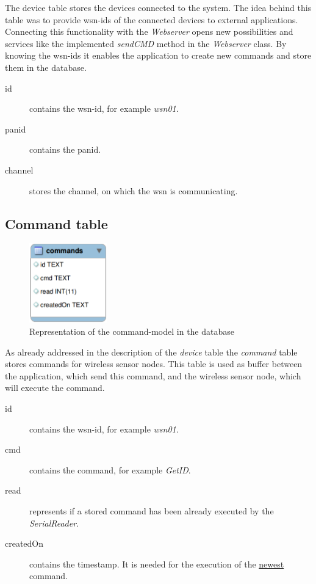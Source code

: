 The device table stores the devices connected to the system. The idea behind this table was to provide wsn-ids of the connected devices to external applications. Connecting this functionality with the \textit{Webserver} opens new possibilities and services like the implemented \textit{sendCMD} method in the \textit{Webserver} class. By knowing the wsn-ids it enables the application to create new commands and store them in the database.

\begin{description}
	\item[id] contains the wsn-id, for example \textit{wsn01}.
	\item[panid] contains the panid.
	\item[channel] stores the channel, on which the wsn is communicating.
\end{description}

\newpage
\subsection{Command table}
\begin{figure}[H]
	\centering
	\includegraphics[width=0.3\textwidth]{pic/DatamodelCMD.png}%
    \caption{Representation of the command-model in the database}
    \label{DatamodelCMDpic}%
\end{figure}

As already addressed in the description of the \textit{device} table the \textit{command} table stores commands for wireless sensor nodes. This table is used as buffer between the application, which send this command, and the wireless sensor node, which will execute the command.

\begin{description}
	\item[id] contains the wsn-id, for example \textit{wsn01}.
	\item[cmd] contains the command, for example \textit{GetID}.
	\item[read] represents if a stored command has been already executed by the \textit{SerialReader}.
	\item[createdOn] contains the timestamp. It is needed for the execution of the \underline{newest} command.
\end{description}

